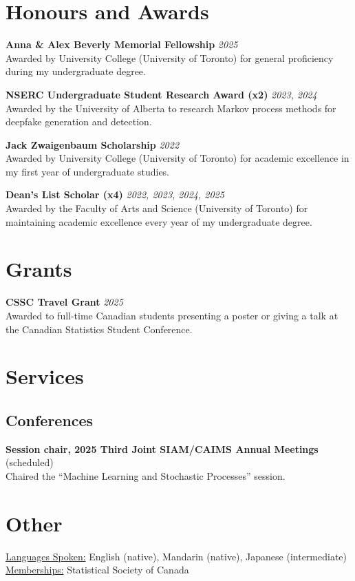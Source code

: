 \documentclass[11pt]{article}
\theoremstyle{definition}
\newcommand{\1}{\mathds 1}
\begin{document}
\section*{Honours and Awards}
\textbf{Anna \& Alex Beverly Memorial Fellowship} \hfill \textit{2025}\\
Awarded by University College (University of Toronto) for general proficiency during my undergraduate degree.

\textbf{NSERC Undergraduate Student Research Award (x2)} \hfill \textit{2023, 2024}\\
Awarded by the University of Alberta to research Markov process methods for deepfake generation and detection. 

\textbf{Jack Zwaigenbaum Scholarship }\hfill \textit{2022}\\
Awarded by University College (University of Toronto) for academic excellence in my first year of undergraduate studies.

\textbf{Dean's List Scholar (x4)} \hfill \textit{2022, 2023, 2024, 2025}\\
Awarded by the Faculty of Arts and Science (University of Toronto) for maintaining academic excellence every year of my undergraduate degree. 

\section*{Grants}
\textbf{CSSC Travel Grant} \hfill \textit{2025}\\
Awarded to full-time Canadian students presenting a poster or giving a talk at the Canadian Statistics Student Conference.




\section*{Services}
\subsection*{Conferences}
\textbf{Session chair, 2025 Third Joint SIAM/CAIMS Annual Meetings} (scheduled) \\
Chaired the ``Machine Learning and Stochastic Processes'' session.


\section*{Other}
\underline{Languages Spoken:} English (native), Mandarin (native), Japanese (intermediate)\\
\underline{Memberships:} Statistical Society of Canada
\end{document}

